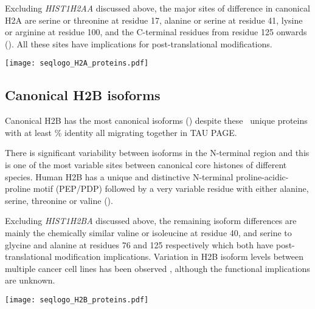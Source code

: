     Excluding \textit{HIST1H2AA} discussed above,
    the major sites of difference in canonical H2A are
    serine or threonine at residue 17,
    alanine or serine at residue 41,
    lysine or arginine at residue 100,
    and the C-terminal residues from residue 125 onwards ().
    All these sites have implications for post-translational modifications.

    \begin{table}
      \caption{%
        Canonical H2A protein isoforms.  Upper panel shows isoforms
        relative to the most common protein sequence.  Lower panel
        shows sequence logo of all isoforms aligned with invariant
        residues in grey.
      }
      \label{tab:H2A-consensus}
      
      \texttt{[image: seqlogo\_H2A\_proteins.pdf]}
    \end{table}

  \subsection{Canonical H2B isoforms}
    Canonical H2B has the most canonical isoforms ()
    despite these \HTwoBUniqueProteins{}~unique proteins 
    with at least \result\% identity
    all migrating together in TAU PAGE.

    There is significant variability between isoforms in the N-terminal region
    and this is one of the most variable sites between canonical
    core histones of different species.
    Human H2B has a unique and distinctive N-terminal proline-acidic-proline motif (PEP/PDP)
    followed by a very variable residue with either alanine, serine,
    threonine or valine ().

    Excluding \textit{HIST1H2BA} discussed above,
    the remaining isoform differences are mainly the chemically
    similar valine or isoleucine at residue 40,
    and serine to glycine and alanine at residues 76 and 125 respectively
    which both have post-translational modification implications.
    Variation in H2B isoform levels between multiple cancer cell
    lines has been observed \citep{Molden2015},
    although the functional implications are unknown.

    \begin{table}
      \caption{%
        Canonical H2B protein isoforms.  Upper panel shows isoforms
        relative to the most common protein sequence.  Lower panel
        shows sequence logo of all isoforms aligned with invariant
        residues in grey.
      }
      \label{tab:H2B-consensus}
      
      \texttt{[image: seqlogo\_H2B\_proteins.pdf]}
    \end{table}

